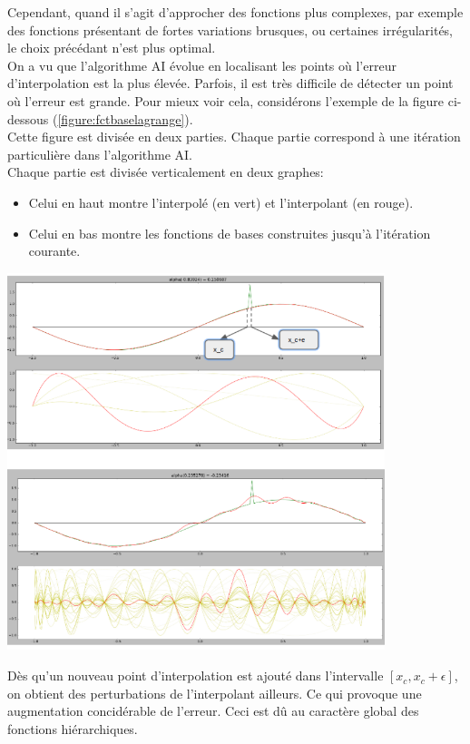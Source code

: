 \hspace{0.5cm} Cependant, quand il s'agit d'approcher des fonctions plus complexes, par exemple des fonctions présentant de fortes variations brusques, ou certaines irrégularités, le choix précédant n'est plus optimal.\\

\hspace{0.5cm} On a vu que l'algorithme AI évolue en localisant les points où l'erreur d'interpolation est la plus élevée. Parfois, il est très difficile de détecter un point où l'erreur est grande. Pour mieux voir cela, considérons l'exemple de la figure ci-dessous (\ref{figure:fctbaselagrange}). \\
Cette figure est divisée en deux parties. Chaque partie correspond à une itération particulière dans l'algorithme AI.\\
Chaque partie est divisée verticalement en deux graphes:
\begin{itemize}
\item Celui en haut montre l'interpolé (en vert) et l'interpolant (en rouge).
\item Celui en bas montre les fonctions de bases construites jusqu'à l'itération courante.
\end{itemize}
\begin{center}
\includegraphics[height= 11cm,width = 11cm]{images/lag_glob.png}
\label{figure:fctbaselagrange}
\end{center}
\newpage
Dès qu'un nouveau point d'interpolation est ajouté dans l'intervalle $ \left [ x_c, x_c+\epsilon \right ]$, on obtient des perturbations de l'interpolant ailleurs. Ce qui provoque une augmentation concidérable de l'erreur. Ceci est dû au caractère global des fonctions hiérarchiques.\\

